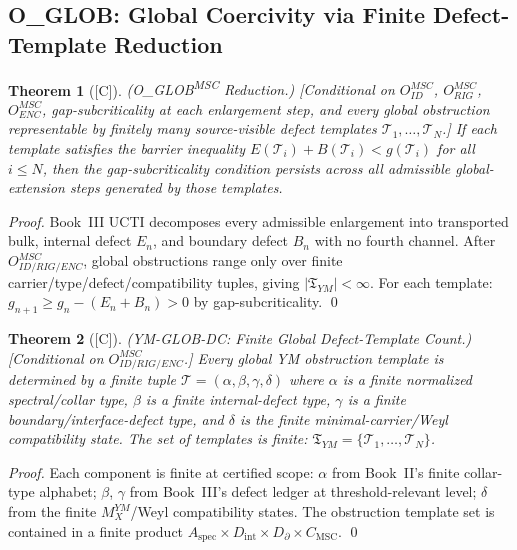 \documentclass[12pt,oneside]{amsbook}
\theoremstyle{plain}
\newtheorem{theorem}{Theorem}[section]
\theoremstyle{definition}
\theoremstyle{remark}
\newcommand{\status}[1]{\textup{[#1]}}
\begin{document}
\subsection{O\_{GLOB}: Global Coercivity via Finite Defect-Template Reduction}

\begin{theorem}[\status{C}]\label{thm:YM-GLOB-reduction}
\textup{(O\_{GLOB}\textsuperscript{MSC} Reduction.)}
\textup{[Conditional on $O_{ID}^{MSC}$, $O_{RIG}^{MSC}$, $O_{ENC}^{MSC}$,
gap-subcriticality at each enlargement step, and every global
obstruction representable by finitely many source-visible defect
templates $\mathcal{T}_1,\ldots,\mathcal{T}_N$.]}
If each template satisfies the barrier inequality
$E(\mathcal{T}_i) + B(\mathcal{T}_i) < g(\mathcal{T}_i)$
for all $i \le N$,
then the gap-subcriticality condition persists across all admissible
global-extension steps generated by those templates.
\end{theorem}

\begin{proof}
Book~III UCTI decomposes every admissible enlargement into transported
bulk, internal defect $E_n$, and boundary defect $B_n$ with no fourth
channel. After $O_{ID/RIG/ENC}^{MSC}$, global obstructions range
only over finite carrier/type/defect/compatibility tuples, giving
$|\mathfrak{T}_{YM}| < \infty$. For each template:
$g_{n+1} \ge g_n - (E_n + B_n) > 0$ by gap-subcriticality.
\qed
\end{proof}

\begin{theorem}[\status{C}]\label{thm:YM-GLOB-DC}
\textup{(YM-GLOB-DC: Finite Global Defect-Template Count.)}
\textup{[Conditional on $O_{ID/RIG/ENC}^{MSC}$.]}
Every global YM obstruction template is determined by a finite tuple
$\mathcal{T} = (\alpha, \beta, \gamma, \delta)$
where $\alpha$ is a finite normalized spectral/collar type,
$\beta$ is a finite internal-defect type,
$\gamma$ is a finite boundary/interface-defect type, and
$\delta$ is the finite minimal-carrier/Weyl compatibility state.
The set of templates is finite:
$\mathfrak{T}_{YM} = \{\mathcal{T}_1, \ldots, \mathcal{T}_N\}$.
\end{theorem}

\begin{proof}
Each component is finite at certified scope: $\alpha$ from Book~II's
finite collar-type alphabet; $\beta$, $\gamma$ from Book~III's defect
ledger at threshold-relevant level; $\delta$ from the finite
$M_X^{YM}$/Weyl compatibility states. The obstruction template set
is contained in a finite product $A_{\mathrm{spec}} \times
D_{\mathrm{int}} \times D_\partial \times C_{\mathrm{MSC}}$.
\qed
\end{proof}
\end{document}

